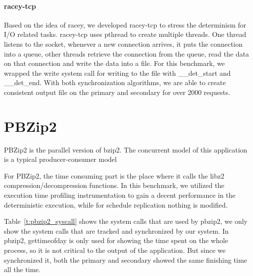 \paragraph{racey-tcp} Based on the idea of racey, we developed racey-tcp to stress the determinism for I/O related tasks. racey-tcp uses pthread to create multiple threads. One thread listens to the socket, whenever a new connection arrives, it puts the connection into a queue, other threads retrieve the connection from the queue, read the data on that connection and write the data into a file. For this benchmark, we wrapped the write system call for writing to the file with \_\_det\_start and \_\_det\_end. With both synchronization algorithms, we are able to create consistent output file on the primary and secondary for over 2000 requests.

\section{PBZip2}
PBZip2 is the parallel version of bzip2. The concurrent model of this application is a typical producer-consumer model





For PBZip2, the time consuming part is the place where it calls the libz2 compression/decompression functions. In this benchmark, we utilized the execution time profiling instrumentation to gain a decent performance in the deterministic execution, while for schedule replication nothing is modified.

Table~\ref{t:pbzip2_syscall} shows the system calls that are used by pbzip2, we only show the system calls that are tracked and synchronized by our system. In pbzip2,  gettimeofday is only used for showing the time spent on the whole process, so it is not critical to the output of the application. But since we synchronized it, both the primary and secondary showed the same finishing time all the time.

